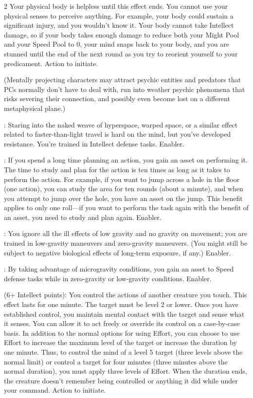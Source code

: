 \begin{multicols}{2}
Your physical body is helpless until this effect ends. You cannot use your physical senses to perceive anything. For example, your body could sustain a significant injury, and you wouldn’t know it. Your body cannot take Intellect damage, so if your body takes enough damage to reduce both your Might Pool and your Speed Pool to 0, your mind snaps back to your body, and you are stunned until the end of the next round as you try to reorient yourself to your predicament. Action to initiate. 

(Mentally projecting characters may attract psychic entities and predators that PCs normally don’t have to deal with, run into weather psychic phenomena that risks severing their connection, and possibly even become lost on a different metaphysical plane.)
 
: Staring into the naked weave of hyperspace, warped space, or a similar effect related to faster-than-light travel is hard on the mind, but you’ve developed resistance. You’re trained in Intellect defense tasks. Enabler. 
 
: If you spend a long time planning an action, you gain an asset on performing it. The time to study and plan for the action is ten times as long as it takes to perform the action. For example, if you want to jump across a hole in the floor (one action), you can study the area for ten rounds (about a minute), and when you attempt to jump over the hole, you have an asset on the jump. This benefit applies to only one roll—if you want to perform the task again with the benefit of an asset, you need to study and plan again. Enabler. 
 
: You ignore all the ill effects of low gravity and no gravity on movement; you are trained in low-gravity maneuvers and
zero-gravity maneuvers. (You might still be subject to negative biological effects of long-term exposure, if any.) Enabler. 
 
: By taking advantage of microgravity conditions, you gain an asset to Speed defense tasks while in zero-gravity or
low-gravity conditions. Enabler. 
 
 (6+ Intellect points): You control the actions of another creature you touch. This effect lasts for one minute. The target must be level 2 or lower. Once you have established control, you maintain mental contact with the target and sense what it senses. You can allow it to act freely or override its control on a case-by-case basis. In addition to the normal options for using Effort, you can choose to use Effort to increase the maximum level of the target or increase the duration by one minute. Thus, to control the mind of a level 5 target (three levels above the normal limit) or control a target for four minutes (three minutes above the normal duration), you must apply three levels of Effort. When the duration ends, the creature doesn’t remember being controlled or anything it did while under your command. Action to initiate. 
 

\end{multicols}
